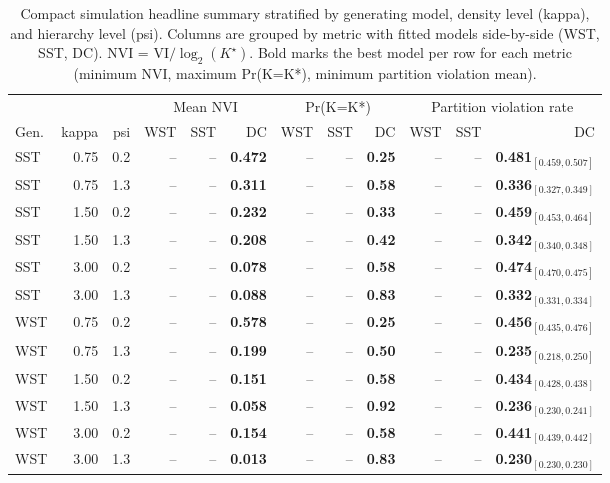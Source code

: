 \begin{table}[!h]
\centering
\caption{Compact simulation headline summary stratified by generating model, density level (kappa), and hierarchy level (psi). Columns are grouped by metric with fitted models side-by-side (WST, SST, DC). NVI = VI$/\log_2(K^\star)$. Bold marks the best model per row for each metric (minimum NVI, maximum Pr(K=K*), minimum partition violation mean).\\\label{tab:sim-headline-compact}}
\centering
\begin{tabular}[t]{lrrrrrrrrrrr}
\toprule
\multicolumn{3}{c}{ } & \multicolumn{3}{c}{Mean NVI} & \multicolumn{3}{c}{Pr(K=K*)} & \multicolumn{3}{c}{Partition violation rate} \\
\cmidrule(l{3pt}r{3pt}){4-6} \cmidrule(l{3pt}r{3pt}){7-9} \cmidrule(l{3pt}r{3pt}){10-12}
Gen. & kappa & psi & WST & SST & DC & WST & SST & DC & WST & SST & DC\\
\midrule
SST & 0.75 & 0.2 & -- & -- & \textbf{0.472} & -- & -- & \textbf{0.25} & -- & -- & \textbf{0.481$_{[0.459,0.507]}$}\\
SST & 0.75 & 1.3 & -- & -- & \textbf{0.311} & -- & -- & \textbf{0.58} & -- & -- & \textbf{0.336$_{[0.327,0.349]}$}\\
SST & 1.50 & 0.2 & -- & -- & \textbf{0.232} & -- & -- & \textbf{0.33} & -- & -- & \textbf{0.459$_{[0.453,0.464]}$}\\
SST & 1.50 & 1.3 & -- & -- & \textbf{0.208} & -- & -- & \textbf{0.42} & -- & -- & \textbf{0.342$_{[0.340,0.348]}$}\\
SST & 3.00 & 0.2 & -- & -- & \textbf{0.078} & -- & -- & \textbf{0.58} & -- & -- & \textbf{0.474$_{[0.470,0.475]}$}\\
SST & 3.00 & 1.3 & -- & -- & \textbf{0.088} & -- & -- & \textbf{0.83} & -- & -- & \textbf{0.332$_{[0.331,0.334]}$}\\
WST & 0.75 & 0.2 & -- & -- & \textbf{0.578} & -- & -- & \textbf{0.25} & -- & -- & \textbf{0.456$_{[0.435,0.476]}$}\\
WST & 0.75 & 1.3 & -- & -- & \textbf{0.199} & -- & -- & \textbf{0.50} & -- & -- & \textbf{0.235$_{[0.218,0.250]}$}\\
WST & 1.50 & 0.2 & -- & -- & \textbf{0.151} & -- & -- & \textbf{0.58} & -- & -- & \textbf{0.434$_{[0.428,0.438]}$}\\
WST & 1.50 & 1.3 & -- & -- & \textbf{0.058} & -- & -- & \textbf{0.92} & -- & -- & \textbf{0.236$_{[0.230,0.241]}$}\\
WST & 3.00 & 0.2 & -- & -- & \textbf{0.154} & -- & -- & \textbf{0.58} & -- & -- & \textbf{0.441$_{[0.439,0.442]}$}\\
WST & 3.00 & 1.3 & -- & -- & \textbf{0.013} & -- & -- & \textbf{0.83} & -- & -- & \textbf{0.230$_{[0.230,0.230]}$}\\
\bottomrule
\end{tabular}
\end{table}
